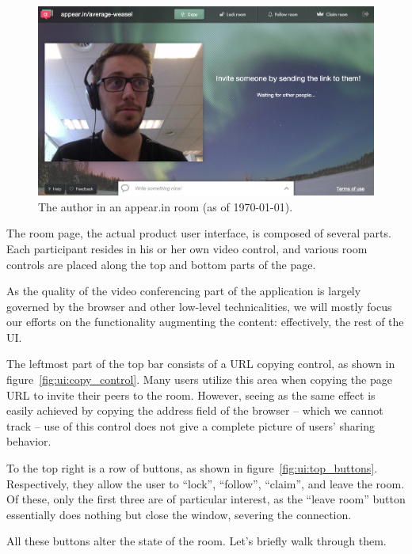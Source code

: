     \begin{figure}[t]
      \centering
        \includegraphics[width=\textwidth]{Figures/screenshots/appearin/in-room}
        \caption{The author in an appear.in room (as of \today).}
        \label{fig:appearin_room}
    \end{figure}

    The room page, the actual product user interface, is composed of several parts. Each participant resides in his or her own video control, and various room controls are placed along the top and bottom parts of the page.

    As the quality of the video conferencing part of the application is largely governed by the browser and other low-level technicalities, we will mostly focus our efforts on the functionality augmenting the content: effectively, the rest of the UI.

    The leftmost part of the top bar consists of a URL copying control, as shown in figure~\ref{fig:ui:copy_control}. Many users utilize this area when copying the page URL to invite their peers to the room. However, seeing as the same effect is easily achieved by copying the address field of the browser -- which we cannot track -- use of this control does not give a complete picture of users' sharing behavior.

    To the top right is a row of buttons, as shown in figure~\ref{fig:ui:top_buttons}. Respectively, they allow the user to ``lock'', ``follow'', ``claim'', and leave the room. Of these, only the first three are of particular interest, as the ``leave room'' button essentially does nothing but close the window, severing the connection.

    All these buttons alter the state of the room. Let's briefly walk through them.

